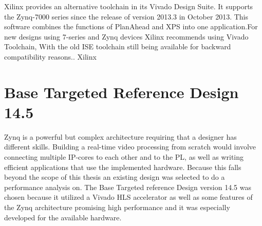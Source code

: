 Xilinx provides an alternative toolchain in its Vivado Design Suite. It supports the Zynq-7000 series since the release of version 2013.3 in October 2013. This software combines the functions of PlanAhead and XPS into one application.For new designs using 7-series and Zynq devices Xilinx recommends using Vivado Toolchain, With the old ISE toolchain still being available for backward compatibility reasons.\cite{isereleasenotes}.
 Xilinx


\section{Base Targeted Reference Design 14.5}
Zynq is a powerful but complex architecture requiring that a designer has different skills. Building a real-time video processing from scratch would involve connecting multiple IP-cores to each other and to the PL, as well as writing efficient applications that use the implemented hardware. Because this falls beyond the scope of this thesis an existing design was selected to do a performance analysis on. The Base Targeted reference Design version 14.5 was chosen because it utilized a Vivado HLS accelerator as well as some features of the Zynq architecture promising high performance and it was especially developed for the available hardware. 

